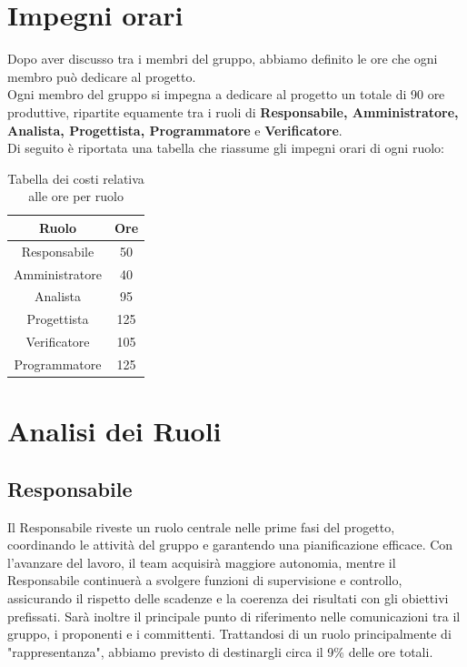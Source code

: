 \documentclass{article}
\begin{document}
	\section{Impegni orari}
	Dopo aver discusso tra i membri del gruppo, abbiamo definito le ore che ogni membro può dedicare al progetto.\\
	Ogni membro del gruppo si impegna a dedicare al progetto un totale di 90 ore produttive, ripartite equamente tra i ruoli di \textbf{Responsabile, Amministratore, Analista, Progettista, Programmatore} e \textbf{Verificatore}.\\
	Di seguito è riportata una tabella che riassume gli impegni orari di ogni ruolo:	
	
	\begin{table}[h!]
	\centering
	\begin{tabular}{|c|c|}
	\hline
	\rowcolor{gray!25}
	Ruolo & Ore \\ \hline
	Responsabile & 50  \\ \hline
	Amministratore & 40 \\ \hline
	Analista & 95  \\ \hline
	Progettista & 125 \\ \hline
	Verificatore & 105 \\ \hline
	Programmatore & 125 \\ \hline
	\end{tabular}
	\caption{Tabella dei costi relativa alle ore per ruolo}
	\end{table}

	\section{Analisi dei Ruoli}
		\subsection{Responsabile}
		Il Responsabile riveste un ruolo centrale nelle prime fasi del progetto, coordinando le attività del gruppo e garantendo una pianificazione efficace.
		Con l’avanzare del lavoro, il team acquisirà maggiore autonomia, mentre il Responsabile continuerà a svolgere funzioni di supervisione e controllo, assicurando il rispetto delle scadenze e la coerenza dei risultati con gli obiettivi prefissati.
		Sarà inoltre il principale punto di riferimento nelle comunicazioni tra il gruppo, i proponenti e i committenti.
		Trattandosi di un ruolo principalmente di "rappresentanza", abbiamo previsto di destinargli circa il 9\% delle ore totali.
		
\end{document}
